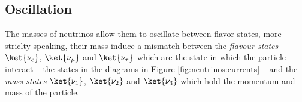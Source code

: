 

\subsection{Oscillation}
\label{sec:th:osc}

The masses of neutrinos allow them to oscillate between flavor states, more striclty speaking, their mass induce a mismatch between the \textit{flavour states} $\ket{\nu_e}$, $\ket{\nu_\mu}$ and $\ket{\nu_\tau}$ which are the state in which the particle interact -- the states in the diagrams in Figure \ref{fig:neutrinos:currents} -- and the \textit{mass states} $\ket{\nu_1}$, $\ket{\nu_2}$ and $\ket{\nu_3}$ which hold the momentum and mass of the particle.

